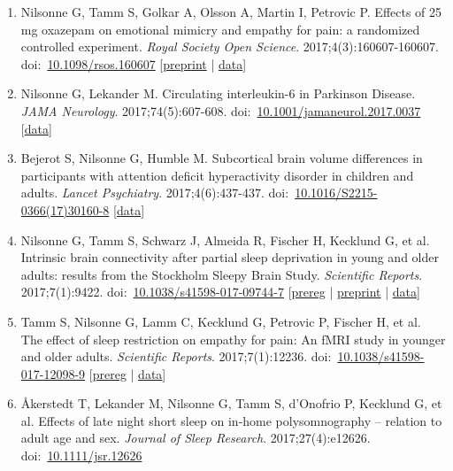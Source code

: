\documentclass[10pt,a4paper,twocolumn]{article}
\begin{document}
\begin{enumerate}
    \item Nilsonne G, Tamm S, Golkar A, Olsson A, Martin I, Petrovic P. Effects of 25 mg oxazepam on emotional mimicry and empathy for pain: a randomized controlled experiment. \textit{Royal Society Open Science}. 2017;4(3):160607-160607. doi:~\href{https://doi.org/10.1098/rsos.160607}{10.1098/rsos.160607} [\href{http://dx.doi.org/10.6084/m9.figshare.1558201}{preprint} | \href{http://dx.doi.org/10.5281/zenodo.60385}{data}]

    \item Nilsonne G, Lekander M. Circulating interleukin-6 in Parkinson Disease. \textit{JAMA Neurology}. 2017;74(5):607-608. doi:~\href{https://doi.org/10.1001/jamaneurol.2017.0037}{10.1001/jamaneurol.2017.0037} [\href{http://dx.doi.org/10.5281/zenodo.182505}{data}]

    \item Bejerot S, Nilsonne G, Humble M. Subcortical brain volume differences in participants with attention deficit hyperactivity disorder in children and adults. \textit{Lancet Psychiatry}. 2017;4(6):437-437. doi:~\href{https://doi.org/10.1016/S2215-0366(17)30160-8}{10.1016/S2215-0366(17)30160-8} [\href{http://dx.doi.org/10.5281/zenodo.345161}{data}]

    \item Nilsonne G, Tamm S, Schwarz J, Almeida R, Fischer H, Kecklund G, et al. Intrinsic brain connectivity after partial sleep deprivation in young and older adults: results from the Stockholm Sleepy Brain Study. \textit{Scientific Reports}. 2017;7(1):9422. doi:~\href{https://doi.org/10.1038/s41598-017-09744-7}{10.1038/s41598-017-09744-7} [\href{https://clinicaltrials.gov/ct2/show/NCT02000076}{prereg} | \href{http://dx.doi.org/10.1101/073494}{preprint} | \href{https://openneuro.org/dataset/ds000201/}{data}]

    \item Tamm S, Nilsonne G, Lamm C, Kecklund G, Petrovic P, Fischer H, et al. The effect of sleep restriction on empathy for pain: An fMRI study in younger and older adults. \textit{Scientific Reports}. 2017;7(1):12236. doi:~\href{https://doi.org/10.1038/s41598-017-12098-9}{10.1038/s41598-017-12098-9} [\href{https://clinicaltrials.gov/ct2/show/NCT02000076}{prereg} | \href{https://openneuro.org/dataset/ds000201/}{data}]

    \item Åkerstedt T, Lekander M, Nilsonne G, Tamm S, d'Onofrio P, Kecklund G, et al. Effects of late night short sleep on in-home polysomnography – relation to adult age and sex. \textit{Journal of Sleep Research}. 2017;27(4):e12626. doi:~\href{https://doi.org/10.1111/jsr.12626}{10.1111/jsr.12626}


\end{enumerate}
\end{document}
